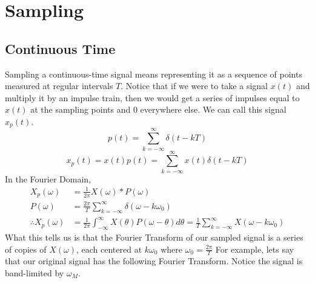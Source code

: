 \section{Sampling}
\subsection{Continuous Time}
Sampling a continuous-time signal means representing it as a sequence of points measured at regular intervals $T$.
Notice that if we were to take a signal $x(t)$ and multiply it by an impulse train, then we would get a series of impulses
equal to $x(t)$ at the sampling points and $0$ everywhere else. We can call this signal $x_p(t)$.
\[
p(t) = \sum_{k=-\infty}^{\infty}{\delta(t-kT)}
\]
\[
x_p(t) = x(t)p(t) = \sum_{k=-\infty}^{\infty}{x(t)\delta(t-kT)}
\]
In the Fourier Domain,
\begin{align*}
    X_p(\omega) &= \frac{1}{2\pi}X(\omega)*P(\omega)\\
    P(\omega) &= \frac{2\pi}{T}\sum_{k=-\infty}^{\infty}{\delta(\omega-k\omega_0)}\\
    \therefore X_p(\omega) &= \frac{1}{2\pi}\int_{-\infty}^{\infty}{X(\theta)P(\omega-\theta)d\theta} = \frac{1}{T}\sum_{k=-\infty}^{\infty}{X(\omega-k\omega_0)}
\end{align*}
What this tells us is that the Fourier Transform of our sampled signal is a series of copies of $X(\omega)$, each centered
at $k\omega_0$ where $\omega_0 = \frac{2\pi}{T}$
For example, lets say that our original signal has the following Fourier Transform. Notice the signal is band-limited by $\omega_M$.
\begin{gitbook-image}
\begin{figure}[H]
    \centering
\end{figure}
\end{gitbook-image}
